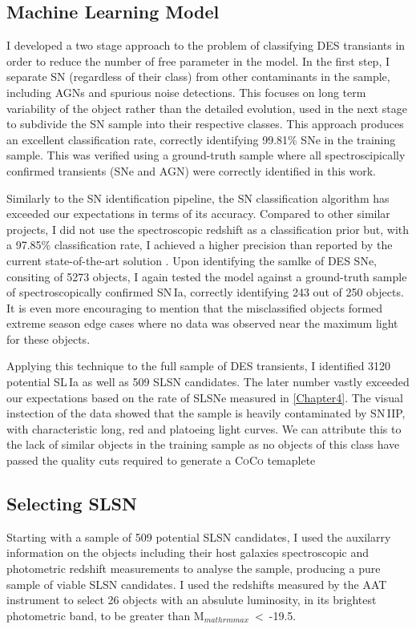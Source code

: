 \subsection{Machine Learning Model}
I developed a two stage approach to the problem of classifying DES transiants in order to reduce the number of free parameter in the model. In the first step, I separate SN (regardless of their class) from other contaminants in the sample, including AGNs and spurious noise detections. This focuses on long term variability of the object rather than the detailed evolution, used in the next stage to subdivide the SN sample
into their respective classes. This approach produces an excellent classification rate, correctly identifying 99.81\% SNe in the training sample. This was verified using a ground-truth sample where all spectroscipically confirmed transients (SNe and AGN) were correctly identified in this work.

Similarly to the SN identification pipeline, the SN classification algorithm has exceeded our expectations in terms of its accuracy. Compared to other similar projects, I did not use the spectroscopic redshift as a classification prior but, with a 97.85\% classification rate, I achieved a higher precision than reported by the current state-of-the-art solution \citep{Lochner2016}. Upon identifying the samlke of DES SNe, consiting of 5273 objects, I again tested the model against a ground-truth sample of spectroscopically confirmed SN\,Ia, correctly identifying 243 out of 250 objects. It is even more encouraging to mention that the misclassified objects formed extreme season edge cases where no data was observed near the maximum light for these objects.

Applying this technique to the full sample of DES transients, I identified 3120 potential SL\,Ia as well as 509 SLSN candidates. The later number vastly exceeded our expectations based on the rate of SLSNe measured in \cref{Chapter4}. The visual instection of the data showed that the sample is heavily contaminated by SN\,IIP, with characteristic long, red and platoeing light curves. We can attribute this to the lack of similar objects in the training sample as no objects of this class have passed the quality cuts required to generate a \textsc{CoCo} temaplete

\subsection{Selecting SLSN}
Starting with a sample of 509 potential SLSN candidates, I used the auxilarry information on the objects including their host galaxies spectroscopic and photometric redshift measurements to analyse the sample, producing a pure sample of viable SLSN candidates. I used the redshifts measured by the AAT instrument to select 26 objects with an absulute luminosity, in its brightest photometric band, to be greater than M$_{mathrm{max}}~<~$-19.5.

